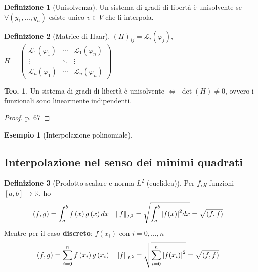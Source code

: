 \documentclass[a4paper,10pt]{article}
\theoremstyle{definition}
\theoremstyle{indentdefinition}
\newtheorem{defn}{Definizione}[section]
\theoremstyle{indenttheorem}
\newtheorem{thm}{Teo.}
\theoremstyle{myremark}
\newtheorem{example*}{Esempio}
\theoremstyle{indentgeneral}
\theoremstyle{plain}
\theoremstyle{plain}
\begin{document}
\begin{defn}[Unisolvenza]
Un sistema di gradi di libertà è unisolvente se $\forall\left(y_{1},\ldots,y_{n}\right)$
esiste unico $v\in V$ che li interpola.
\end{defn}

\begin{defn}[Matrice di Haar]
$\left(H\right)_{ij}=\mathscr{L}_{i}\left(\varphi_{j}\right)$, $H=\begin{pmatrix}\mathscr{L}_{1}\left(\varphi_{1}\right) & \cdots & \mathscr{L}_{1}\left(\varphi_{n}\right)\\
\vdots & \ddots & \vdots\\
\mathscr{L}_{n}\left(\varphi_{1}\right) & \cdots & \mathscr{L}_{n}\left(\varphi_{n}\right)
\end{pmatrix}$
\end{defn}

\begin{thm}
Un sistema di gradi di libertà è unisolvente $\Longleftrightarrow$
$\det\left(H\right)\neq0$, ovvero i funzionali sono linearmente indipendenti.
\end{thm}

\begin{proof}
    p. 67
\end{proof}

\begin{example*}[Interpolazione polinomiale]
    
\end{example*}


\subsection{Interpolazione nel senso dei minimi quadrati}
\begin{defn}[Prodotto scalare e norma $L^{2}$ (euclidea)]
Per $f,g$ funzioni $\left[a,b\right]\rightarrow\mathbb{R}$, ho
\begin{align*}
\left(f,g\right) & =\int_{a}^{b}f\left(x\right)g\left(x\right)dx & \left\Vert f\right\Vert _{L^{2}} & =\sqrt{\int_{a}^{b}\abs{f(x)}^2dx}=\sqrt{(f,f)}
\end{align*}
Mentre per il caso \textbf{discreto}: $f(x_i)$ con $i=0,\dots,n$
\begin{align*}
\left(f,g\right) & =\sum_{i=0}^nf\left(x_i\right)g\left(x_i\right) & \left\Vert f\right\Vert _{L^{2}} & =\sqrt{\sum_{i=0}^n\abs{f(x_i)}^2}=\sqrt{(f,f)}
\end{align*}
\end{defn}
\end{document}
